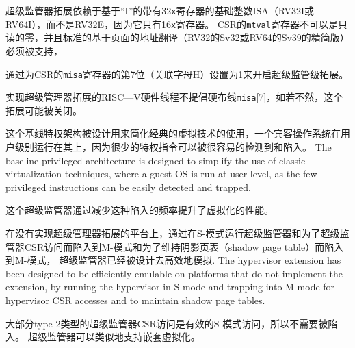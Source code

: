 超级监管器拓展依赖于基于“I”的带有32{\tt x}寄存器的基础整数ISA（RV32I或RV64I），而不是RV32E，因为它只有16{\tt x}寄存器。
CSR的{\tt mtval}寄存器不可以是只读的零，并且标准的基于页面的地址翻译（RV32的Sv32或RV64的Sv39的精简版）必须被支持，

通过为CSR的{\tt misa}寄存器的第7位（关联字母H）设置为1来开启超级监管级拓展。

实现超级管理器拓展的RISC—V硬件线程不提倡硬布线{\tt misa}[7]，如若不然，这个拓展可能被关闭。

\begin{commentary}

这个基线特权架构被设计用来简化经典的虚拟技术的使用，一个宾客操作系统在用户级别运行在其上，因为很少的特权指令可以被很容易的检测到和陷入。
The baseline privileged architecture is designed to simplify the use of classic
virtualization techniques, where a guest OS is run at user-level, as
the few privileged instructions can be easily detected and trapped.

这个超级监管器通过减少这种陷入的频率提升了虚拟化的性能。

在没有实现超级管理器拓展的平台上，通过在S-模式运行超级监管器和为了超级监管器CSR访问而陷入到M-模式和为了维持阴影页表（shadow page table）而陷入到M-模式，
超级监管器已经被设计去高效地模拟.
The hypervisor extension has been designed to be efficiently
emulable on platforms that do not implement the extension, by running
the hypervisor in S-mode and trapping into M-mode for hypervisor CSR accesses
and to maintain shadow page tables.  

大部分type-2类型的超级监管器CSR访问是有效的S-模式访问，所以不需要被陷入。
超级监管器可以类似地支持嵌套虚拟化。
\end{commentary}

